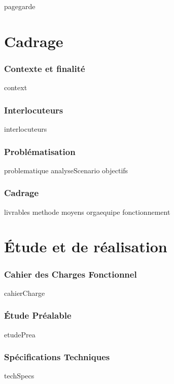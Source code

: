 \documentclass[a4paper, 12pt, titlepage, oneside, french]{article}
\begin{document}
{pagegarde}
\newpage

\tableofcontents
\newpage




\part{Cadrage}
\section{Contexte et finalité}
{context}
\newpage

\section{Interlocuteurs}
{interlocuteurs}
\newpage

\section{Problématisation}
{problematique}
{analyseScenario}
{objectifs}
\newpage

\section{Cadrage}
{livrables}
{methode}
{moyens}
{orgaequipe}
{fonctionnement}
\newpage


\part{Étude et de réalisation}

\section{Cahier des Charges Fonctionnel}
{cahierCharge}
\newpage

\section{Étude Préalable}
{etudePrea}
\newpage

\section{Spécifications Techniques}
{techSpecs}
\newpage
\end{document}
